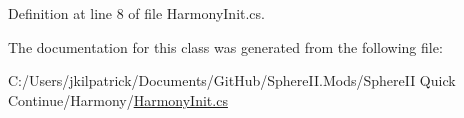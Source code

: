 Definition at line 8 of file Harmony\+Init.\+cs.



The documentation for this class was generated from the following file\+:\begin{DoxyCompactItemize}
\item 
C\+:/\+Users/jkilpatrick/\+Documents/\+Git\+Hub/\+Sphere\+I\+I.\+Mods/\+Sphere\+I\+I Quick Continue/\+Harmony/\mbox{\hyperlink{_sphere_i_i_01_quick_01_continue_2_harmony_2_harmony_init_8cs}{Harmony\+Init.\+cs}}\end{DoxyCompactItemize}
